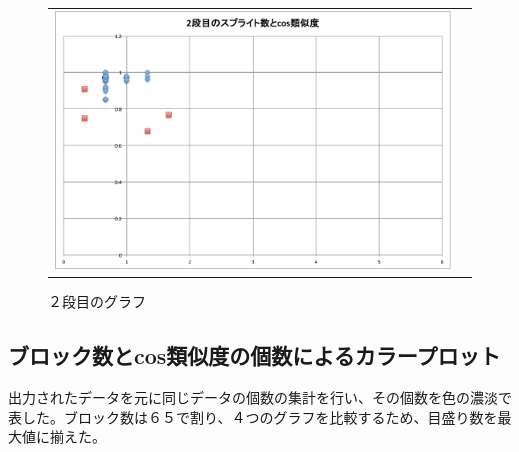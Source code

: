 \documentclass[a4paper,10pt,onecolumn,oneside,openany]{jsbook}
\begin{document}
\begin{figure}[h]
\begin{tabular}{cc}
\begin{minipage}[t]{0.45\hsize}
	 \includegraphics[keepaspectratio, scale = 0.25]{mazegame_second_splite.pdf}
	 \caption{２段目のグラフ}
	 \label{mazegame_second_splite_cos}
	\end{minipage}
 \end{tabular}
 \end{figure}
 
 
  \subsection{ブロック数とcos類似度の個数によるカラープロット}
出力されたデータを元に同じデータの個数の集計を行い、その個数を色の濃淡で表した。ブロック数は６５で割り、４つのグラフを比較するため、目盛り数を最大値に揃えた。 
 
\end{document}
